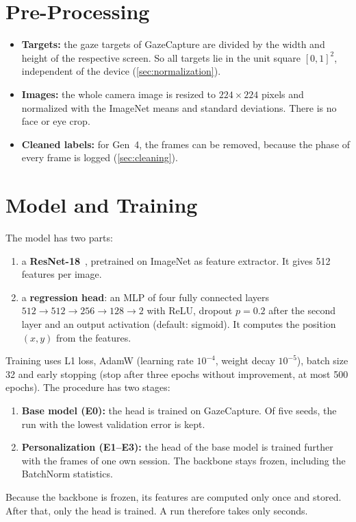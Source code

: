 \section{Pre-Processing}
\label{sec:meth_vorverarbeitung}
\begin{itemize}
  \item \textbf{Targets:} the gaze targets of GazeCapture are divided by the
        width and height of the respective screen. So all targets lie in the
        unit square $[0,1]^2$, independent of the device
        (\cref{sec:normalization}).
  \item \textbf{Images:} the whole camera image is resized to
        $224\times224$ pixels and normalized with the ImageNet means and
        standard deviations. There is no face or eye crop.
  \item \textbf{Cleaned labels:} for Gen~4, the  frames can be
        removed, because the phase of every frame is logged
        (\cref{sec:cleaning}).
\end{itemize}

\section{Model and Training}
\label{sec:meth_modell}
The model has two parts:
\begin{enumerate}
  \item a \textbf{ResNet-18}~\cite{he2016resnet}, pretrained on ImageNet
        as feature extractor. It gives
        512 features per image.
  \item a \textbf{regression head}: an MLP of four fully connected layers
        $512 \to 512 \to 256 \to 128 \to 2$ with ReLU, dropout $p=0.2$ after
        the second layer and an output activation (default: sigmoid). It
        computes the position $(x,y)$ from the features.
\end{enumerate}
Training uses L1 loss, AdamW (learning rate $10^{-4}$,
weight decay $10^{-5}$), batch size 32 and early stopping (stop after three
epochs without improvement, at most 500 epochs). The procedure has two stages:
\begin{enumerate}
  \item \textbf{Base model (E0):} the head is trained on GazeCapture. Of five seeds, the run with the lowest
        validation error is kept.
  \item \textbf{Personalization (E1--E3):} the head of the base model is trained
        further with the frames of one own session.
        The backbone stays frozen, including the BatchNorm statistics.
\end{enumerate}
Because the backbone is frozen, its features are computed only once and stored. After that, only the head is trained. A run therefore takes
only seconds.

